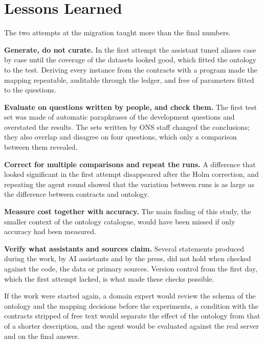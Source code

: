 \section{Lessons Learned}
The two attempts at the migration taught more than the final numbers.

\textbf{Generate, do not curate.} In the first attempt the assistant tuned aliases case by
case until the
coverage of the datasets looked good, which fitted the ontology to the test. Deriving every
instance from the contracts with a program made the mapping repeatable, auditable through
the ledger, and free of parameters fitted to the questions.

\textbf{Evaluate on questions written by people, and check them.} The first test set was
made of automatic paraphrases of the development questions and overstated the results.
The sets written by ONS staff changed the conclusions; they also overlap and disagree on
four questions, which only a comparison between them revealed.

\textbf{Correct for multiple comparisons and repeat the runs.} A difference that looked
significant in the first attempt disappeared after the Holm correction, and repeating the
agent round showed that the variation between runs is as large as the difference between
contracts and ontology.

\textbf{Measure cost together with accuracy.} The main finding of this study, the smaller
context of the ontology catalogue, would have been missed if only accuracy had been
measured.

\textbf{Verify what assistants and sources claim.} Several statements produced during the
work, by AI assistants and by the press, did not hold when checked against the code, the
data or primary sources. Version control from the first day, which the first attempt
lacked, is what made these checks possible.

If the work were started again, a domain expert would review the schema of the ontology
and the mapping decisions before the experiments, a condition with the contracts stripped
of free text would separate the effect of the ontology from that of a shorter description,
and the agent would be evaluated against the real server and on the final answer.
